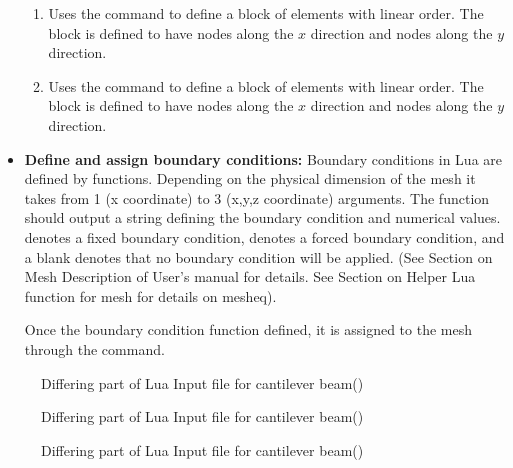 \begin{itemize}
\begin{enumerate}
    \item{}
    Uses the  command to define a block of 
    elements with linear order. The block is defined to have 
     nodes along the $x$ direction and 
     nodes along the $y$ direction.

    \item{}
    Uses the  command to define a block of 
    elements with linear order. The block is defined to have 
     nodes along the $x$ direction and 
     nodes along the $y$ direction.
  \end{enumerate}

  \item{\textbf{Define and assign boundary conditions:}}
  Boundary conditions in Lua are defined by functions. Depending
  on the physical dimension of the mesh it takes from 1 (x coordinate)
  to 3 (x,y,z coordinate) arguments. The function should output 
  a string defining the boundary condition and numerical values.
   denotes a fixed boundary condition,  denotes a 
  forced boundary condition, and a blank denotes that no boundary
  condition will be applied. (See Section on Mesh Description of
  User's manual for details. See Section on Helper Lua function for
  mesh for details on mesheq).

  Once the boundary condition function defined, it is assigned 
  to the mesh through the  command.

\end{itemize}


\clearpage
\begin{figure}[htbp]
  {\footnotesize
  }
  \caption{Differing part of Lua Input file for cantilever 
                                     beam()}
  \label{fig:LuaFile:beam_test.lua}
  {\footnotesize
  }
  \caption{Differing part of Lua Input file for cantilever 
                         beam()}
  \label{fig:LuaFile:beam_test_blocks2dn.lua}
  {\footnotesize
  }
  \caption{Differing part of Lua Input file for cantilever 
                         beam()}
  \label{fig:LuaFile:beam_test_blocks2d.lua}
\end{figure}


